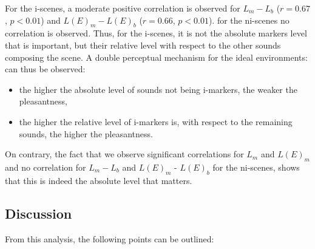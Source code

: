 \documentclass[12pt]{elsarticle}
\begin{document}
For the i-scenes, a moderate positive correlation is observed for $L_m-L_b$ ($r=0.67$, $p<0.01$) and $L(E)_m-L(E)_b$ ($r=0.66$, $p<0.01$). for the ni-scenes no correlation is observed. Thus, for the i-scenes, it is not the absolute markers level that is important, but their relative level with respect to the other sounds composing the scene. A double perceptual mechanism for the ideal environments: can thus be observed:


\begin{itemize}
\item the higher the absolute level of sounds not being i-markers, the weaker the pleasantness,
\item the higher the relative level of i-markers is, with respect to the remaining sounds, the higher the pleasantness.
\end{itemize}


On contrary, the fact that we observe significant correlations for $L_m$ and $L(E)_m$ and no correlation for $L_m-L_b$ and $L(E)_m$ - $L(E)_b$ for the ni-scenes, shows that this is indeed the absolute level that matters.

\subsection{Discussion}


From this analysis, the following points can be outlined:
\end{document}
